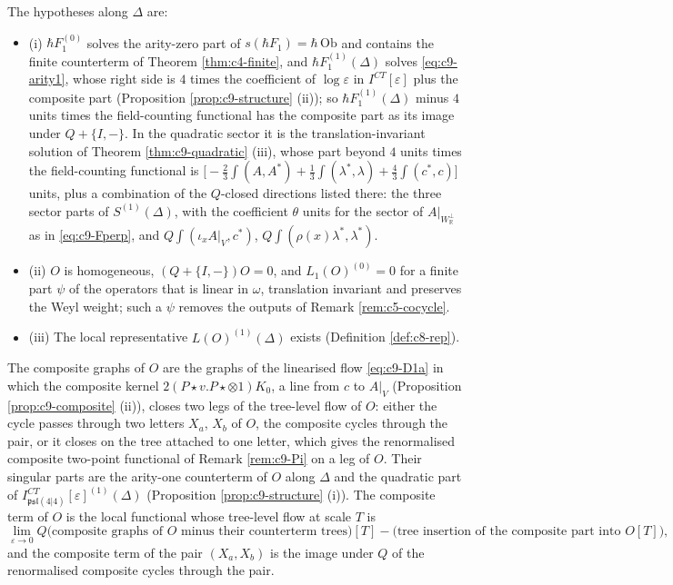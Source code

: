 \begin{definition}
\label{def:c10-hyp}
The hypotheses along $\Delta$ are:
\begin{itemize}
\item (i) $\hbar F_1^{(0)}$ solves the arity-zero part of $s(\hbar F_1)=\hbar\,\mathrm{Ob}$ and contains the finite counterterm of Theorem \ref{thm:c4-finite}, and $\hbar F_1^{(1)}(\Delta)$ solves \eqref{eq:c9-arity1}, whose right side is $4$ times the coefficient of $\log\varepsilon$ in $I^{CT}[\varepsilon]$ plus the composite part (Proposition \ref{prop:c9-structure} (ii)); so $\hbar F_1^{(1)}(\Delta)$ minus $4$ units times the field-counting functional has the composite part as its image under $Q+\{I,-\}$. In the quadratic sector it is the translation-invariant solution of Theorem \ref{thm:c9-quadratic} (iii), whose part beyond $4$ units times the field-counting functional is $\big[-\tfrac23\int(A,A^*)+\tfrac13\int(\lambda^*,\lambda)+\tfrac43\int(c^*,c)\big]$ units, plus a combination of the $Q$-closed directions listed there: the three sector parts of $S^{(1)}(\Delta)$, with the coefficient $\theta$ units for the sector of $A|_{W_{\mathbb R}^\perp}$ as in \eqref{eq:c9-Fperp}, and $Q\int(\iota_xA|_V,c^*)$, $Q\int(\rho(x)\lambda^*,\lambda^*)$.
\item (ii) $O$ is homogeneous, $(Q+\{I,-\})O=0$, and $L_1(O)^{(0)}=0$ for a finite part $\psi$ of the operators that is linear in $\omega$, translation invariant and preserves the Weyl weight; such a $\psi$ removes the outputs of Remark \ref{rem:c5-cocycle}.
\item (iii) The local representative $L(O)^{(1)}(\Delta)$ exists (Definition \ref{def:c8-rep}).
\end{itemize}
The composite graphs of $O$ are the graphs of the linearised flow \eqref{eq:c9-D1a} in which the composite kernel $2(P\star v.P\star\otimes1)K_0$, a line from $c$ to $A|_V$ (Proposition \ref{prop:c9-composite} (ii)), closes two legs of the tree-level flow of $O$: either the cycle passes through two letters $X_a$, $X_b$ of $O$, the composite cycles through the pair, or it closes on the tree attached to one letter, which gives the renormalised composite two-point functional of Remark \ref{rem:c9-Pi} on a leg of $O$. Their singular parts are the arity-one counterterm of $O$ along $\Delta$ and the quadratic part of $I^{CT}_{\mathfrak{psl}(4|4)}[\varepsilon]^{(1)}(\Delta)$ (Proposition \ref{prop:c9-structure} (i)). The composite term of $O$ is the local functional whose tree-level flow at scale $T$ is
\[
\lim_{\varepsilon\to0}Q\big(\text{composite graphs of }O\text{ minus their counterterm trees}\big)[T]-\big(\text{tree insertion of the composite part into }O[T]\big),
\]
and the composite term of the pair $(X_a,X_b)$ is the image under $Q$ of the renormalised composite cycles through the pair.
\end{definition}

